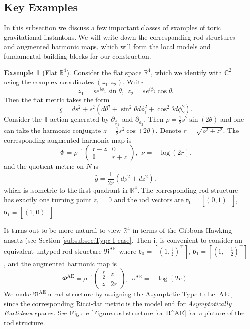 \documentclass[a4paper,11pt]{amsart}
\theoremstyle{definition}
\newtheorem{example}[theorem]{Example}
\numberwithin{equation}{section}
\newcommand{\p}{\partial}
\newcommand{\C}{\mathbb{C}}
\newcommand{\R}{\mathbb{R}}
\newcommand{\dT}{\mathbb{T}}
\newcommand{\mv} {\mathfrak v}
\newcommand{\mR} {\mathfrak R}
\DeclareMathOperator{\Ae}{AE}
\begin{document}
\subsection{Key Examples}
\label{ss:model examples}

In this subsection we discuss a few important classes of examples of toric gravitational instantons. We will write down the corresponding  rod structures and  augmented harmonic maps, which will form the local models and fundamental building blocks for our construction. 
\begin{example}[Flat $\R^4$]\label{ex1}
    Consider the flat space $\R^4$, which we identify with $\C^2$ using the complex coordinates $(z_1, z_2)$. Write $$z_1=se^{i\phi_1}\sin \theta, \ \ z_2=se^{i\phi_2}\cos\theta.$$ Then the flat metric takes the form
$$g=ds^2+s^2(d\theta^2+\sin^2\theta d\phi_1^2+\cos^2\theta d\phi_2^2).$$
Consider the $\dT$ action generated by $\p_{\phi_1}$ and $\p_{\phi_2}$. Then $\rho=\frac{1}{2}s^2\sin(2\theta)$ and one can take the harmonic conjugate $z=\frac{1}{2}s^2\cos(2\theta)$.  Denote $r=\sqrt{\rho^2+z^2}$. The corresponding augmented harmonic map is
$$\Phi=\rho^{-1}\begin{pmatrix}
r-z & 0 \\
0 & r+z
\end{pmatrix}, \ \ \nu=-\log (2r).
$$
and the quotient metric on $N$ is $$\widehat g=\frac{1}{2r}(d\rho^2+dz^2),$$
which is isometric to the first quadrant in $\mathbb R^4$. The corresponding rod structure  has exactly one turning point $z_1=0$ and the rod vectors are $\mv_0=[(0, 1)^{\top}]$, $\mv_1=[(1,0)^{\top}]$.

It turns out to be more natural to view $\R^4$ in terms of the Gibbons-Hawking ansatz (see Section \ref{subsubsec:Type I case}. Then it is convenient to  consider an equivalent untyped rod structure $\mR^{\Ae}$ where $\mv_0=[(1, \frac{1}{2})^{\top}]$, $\mv_1=[(1,-\frac{1}{2})^{\top}]$, and the augmented harmonic map is
\begin{equation}\label{e:standard harmonic map R4}\Phi^{\Ae}=\rho^{-1}\begin{pmatrix}
\frac r2 & z \\
z & 2r
\end{pmatrix}, \ \ \nu^{\Ae}=-\log (2r). 
\end{equation}
We make $\mR^{\Ae}$ a rod structure by assigning the Asymptotic Type to be $\Ae$, since the corresponding Ricci-flat metric is the model end  for \emph{Asymptotically Euclidean} spaces. See Figure \ref{Figure:rod structure for R^AE} for a picture of the rod structure.
 

\end{example}
\end{document}
